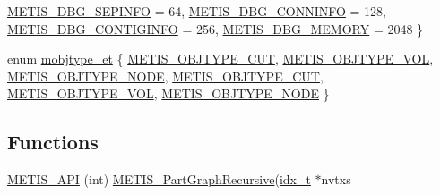 \begin{DoxyCompactItemize}
\newline
\hyperlink{a00879_ac50415aa8003f9b7bf0aabb2b0d50877af722c2e095672f4e307b998fa15cb10d}{M\+E\+T\+I\+S\+\_\+\+D\+B\+G\+\_\+\+S\+E\+P\+I\+N\+FO} = 64, 
\hyperlink{a00879_ac50415aa8003f9b7bf0aabb2b0d50877a9cca1bd8cfe9cdc953d022f9bd248cc7}{M\+E\+T\+I\+S\+\_\+\+D\+B\+G\+\_\+\+C\+O\+N\+N\+I\+N\+FO} = 128, 
\hyperlink{a00879_ac50415aa8003f9b7bf0aabb2b0d50877ac0e11c887ddb971960bf285b93bb622e}{M\+E\+T\+I\+S\+\_\+\+D\+B\+G\+\_\+\+C\+O\+N\+T\+I\+G\+I\+N\+FO} = 256, 
\hyperlink{a00879_ac50415aa8003f9b7bf0aabb2b0d50877aefec4afc67dc93146c641a7ca8cc07cd}{M\+E\+T\+I\+S\+\_\+\+D\+B\+G\+\_\+\+M\+E\+M\+O\+RY} = 2048
 \}
\item 
enum \hyperlink{a00879_ad8332705ea18c63b06801b0630db9bb8}{mobjtype\+\_\+et} \{ \newline
\hyperlink{a00876_ad8332705ea18c63b06801b0630db9bb8a573335f3178103a5f6989eb71f6d6408}{M\+E\+T\+I\+S\+\_\+\+O\+B\+J\+T\+Y\+P\+E\+\_\+\+C\+UT}, 
\hyperlink{a00876_ad8332705ea18c63b06801b0630db9bb8ac3b12f1f07abe8b2e370eec53c54b99e}{M\+E\+T\+I\+S\+\_\+\+O\+B\+J\+T\+Y\+P\+E\+\_\+\+V\+OL}, 
\hyperlink{a00876_ad8332705ea18c63b06801b0630db9bb8aa12a14948e39090b8ca35989d375050f}{M\+E\+T\+I\+S\+\_\+\+O\+B\+J\+T\+Y\+P\+E\+\_\+\+N\+O\+DE}, 
\hyperlink{a00879_ad8332705ea18c63b06801b0630db9bb8a573335f3178103a5f6989eb71f6d6408}{M\+E\+T\+I\+S\+\_\+\+O\+B\+J\+T\+Y\+P\+E\+\_\+\+C\+UT}, 
\newline
\hyperlink{a00879_ad8332705ea18c63b06801b0630db9bb8ac3b12f1f07abe8b2e370eec53c54b99e}{M\+E\+T\+I\+S\+\_\+\+O\+B\+J\+T\+Y\+P\+E\+\_\+\+V\+OL}, 
\hyperlink{a00879_ad8332705ea18c63b06801b0630db9bb8aa12a14948e39090b8ca35989d375050f}{M\+E\+T\+I\+S\+\_\+\+O\+B\+J\+T\+Y\+P\+E\+\_\+\+N\+O\+DE}
 \}
\end{DoxyCompactItemize}
\subsection*{Functions}
\begin{DoxyCompactItemize}
\item 
\hyperlink{a00879_a57b80ef4a852110c44a76feb8238c2b4}{M\+E\+T\+I\+S\+\_\+\+A\+PI} (int) \hyperlink{a00260_a25fc90fd934931239b3c98ac4bdbce76}{M\+E\+T\+I\+S\+\_\+\+Part\+Graph\+Recursive}(\hyperlink{a00876_aaa5262be3e700770163401acb0150f52}{idx\+\_\+t} $\ast$nvtxs
\end{DoxyCompactItemize}
